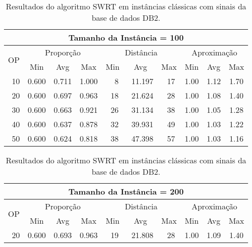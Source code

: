 \begin{table}[!tb]
\caption{Resultados do algoritmo SWRT em instâncias clássicas com sinais da base de dados DB2.}
\label{table:GZLFZWZB}
\begin{center}
\scriptsize
{\def\arraystretch{1.05}\tabcolsep=8pt
\begin{tabular}{|c|c|c|c|c|c|c|c|c|c|}
\hline
\multicolumn{10}{|c|}{\bf Tamanho da Instância = 100}                                                                          \\ \hline
\multirow{2}{*}{OP} & \multicolumn{3}{c|}{Proporção} & \multicolumn{3}{c|}{Distância} & \multicolumn{3}{c|}{Aproximação}   \\ \cline{2-10}
                    & Min       & Avg      & Max      & Min      & Avg      & Max     & Min     & Avg    & Max             \\ \hline
~10                 & 0.600     & 0.711    & 1.000    & ~~8      & ~11.197  & ~17     & 1.00    & 1.12   & 1.70            \\ \hline
~20                 & 0.600     & 0.697    & 0.963    & ~18      & ~21.624  & ~28     & 1.00    & 1.08   & 1.40            \\ \hline
~30                 & 0.600     & 0.663    & 0.921    & ~26      & ~31.134  & ~38     & 1.00    & 1.05   & 1.28            \\ \hline
~40                 & 0.600     & 0.637    & 0.878    & ~32      & ~39.931  & ~49     & 1.00    & 1.03   & 1.22            \\ \hline
~50                 & 0.600     & 0.624    & 0.818    & ~38      & ~47.398  & ~57     & 1.00    & 1.03   & 1.16            \\ \hline
\end{tabular}%
\vspace{5pt}
\begin{tabular}{|c|c|c|c|c|c|c|c|c|c|}
\hline
\multicolumn{10}{|c|}{\bf Tamanho da Instância = 200}                                                                          \\ \hline
\multirow{2}{*}{OP} & \multicolumn{3}{c|}{Proporção} & \multicolumn{3}{c|}{Distância} & \multicolumn{3}{c|}{Aproximação}   \\ \cline{2-10}
                    & Min       & Avg      & Max      & Min      & Avg      & Max     & Min     & Avg    & Max             \\ \hline
~20                 & 0.600     & 0.693    & 0.963    & ~19      & ~21.808  & ~28     & 1.00    & 1.09   & 1.40            \\ \hline

\end{tabular}}
\end{center}
\end{table}
